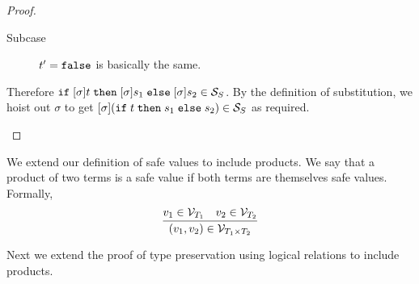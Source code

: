 \documentclass[11pt,letterpaper]{article}
\newcommand{\ifthenelse}[3]{%
  \mathtt{if}\;#1\;\mathtt{then}\;#2\;\mathtt{else}\;#3%
}
\begin{document}
\begin{proof}
\begin{description}
\begin{description}
        \item[Subcase] $t^\prime = \mathtt{false}$ is basically the same.
      \end{description}
      Therefore $\ifthenelse{[\sigma]t}{[\sigma]s_1}{[\sigma]s_2} \in \S_S$.
      By the definition of substitution, we hoist out $\sigma$ to get
      $[\sigma](\t) \in \S_S$ as required.
  \end{description}
\end{proof}

We extend our definition of safe values to include products.
We say that a product of two terms is a safe value if both terms are themselves
safe values.
Formally,
%
\begin{equation*}
  \infer{(v_1, v_2) \in \V_{T_1 \times T_2}}{
    v_1 \in \V_{T_1}
    &
    v_2 \in \V_{T_2}
  }
\end{equation*}

Next we extend the proof of type preservation using logical relations to
include products.
\end{document}
